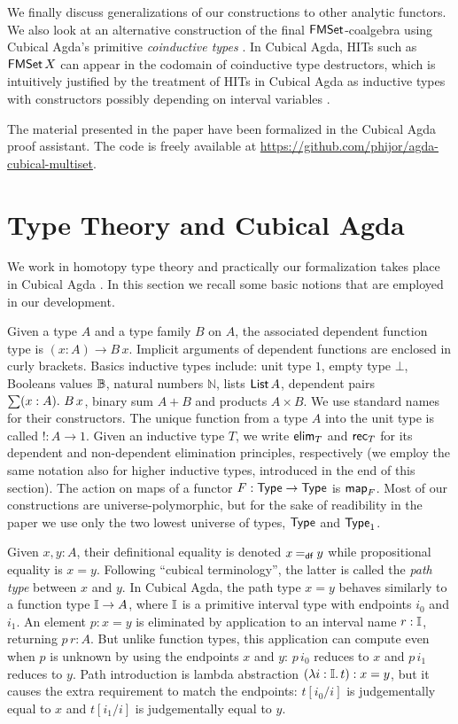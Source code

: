 \documentclass[runningheads]{llncs}
\begin{document}
We finally discuss generalizations of our constructions to other analytic functors. We also look at an alternative construction of the final $\operatorname{\mathsf{FMSet}}$-coalgebra using Cubical Agda's primitive \emph{coinductive types} \cite{Vezzosi2019}. In Cubical Agda, HITs such as $\operatorname{\mathsf{FMSet}} X$ can appear in the codomain of coinductive type destructors, which is intuitively justified by the treatment of HITs in Cubical Agda as inductive types with constructors possibly depending on interval variables \cite{Coquand2018,Cavallo2019}.

The material presented in the paper have been formalized in the Cubical Agda proof
assistant. The code is freely available at \url{https://github.com/phijor/agda-cubical-multiset}.

\section{Type Theory and Cubical Agda}

We work in homotopy type theory \cite{HoTTBook} and practically our formalization takes place in Cubical Agda \cite{Vezzosi2019}. In this section we recall some basic notions that are employed in our development.

Given a type $A$ and a type family $B$ on $A$, the associated dependent function type is $(x : A) \to B \, x$. Implicit arguments of dependent functions are enclosed in curly brackets. Basics inductive types include: unit type $1$, empty type $\bot$, Booleans values $\mathbb{B}$, natural numbers $ℕ$, lists $\operatorname{\mathsf{List}} A$, dependent pairs $\sum (x : A) \mathpunct{.}\, B \, x$, binary sum $A + B$ and products $A \times B$. We use standard names for their constructors. The unique function from a type $A$ into the unit type is called $! : A \to 1$. Given an inductive type $T$, we write $\operatorname{\mathsf{elim}}_{T}$ and $\operatorname{\mathsf{rec}}_{T}$ for its dependent and non-dependent elimination  principles, respectively (we employ the same notation also for higher inductive types, introduced in the end of this section). The action on maps of a functor $F : \operatorname{\mathsf{Type}} \to \operatorname{\mathsf{Type}}$ is $\operatorname{\mathsf{map}}_{F}$. Most of our constructions are universe-polymorphic, but for the sake of readibility in the paper we use only the two lowest universe of types, $\operatorname{\mathsf{Type}}$ and $\operatorname{\mathsf{Type}}_1$.

Given $x, y : A$, their definitional equality is denoted $x \mathbin{=_\mathsf{df}} y$ while propositional equality is $x = y$.
Following ``cubical terminology'', the latter is called the \emph{path type} between $x$ and $y$.
In Cubical Agda, the path type $x = y$ behaves similarly to a function type $\mathbb{I} \to A$, where $\mathbb{I}$ is a primitive interval type with endpoints $i_0$ and $i_1$.
An element $p : x = y$ is eliminated by application to an interval name $r : \mathbb{I}$, returning $p \, r : A$.
But unlike function types, this application can compute even when $p$ is unknown by using the endpoints $x$ and $y$: $p \,i_0$ reduces to $x$ and $p \,i_1$ reduces to $y$.
Path introduction is lambda abstraction $(\lambda i : \mathbb{I}.\,t) : x = y$, but it causes the extra requirement to match the endpoints: $t[i_0 / i]$ is judgementally equal to $x$ and $t[i_1 / i]$ is judgementally equal to  $y$. 
\end{document}
